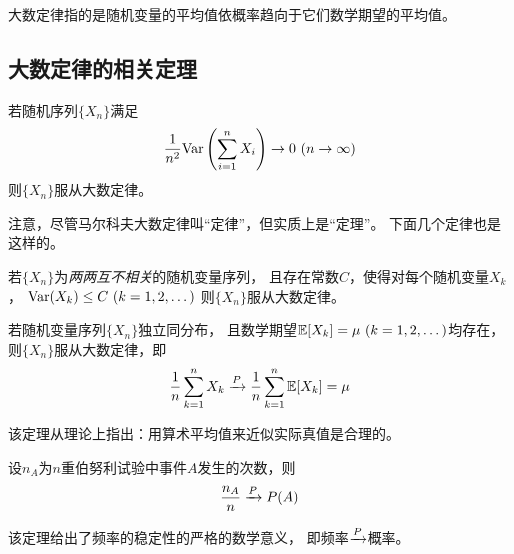 \begin{remark}
  大数定律指的是随机变量的平均值依概率趋向于它们数学期望的平均值。
\end{remark}

\subsection{大数定律的相关定理}
\begin{theorem}[马尔可夫大数定律]
  若随机序列$\{X_n\}$满足
  \begin{displaymath}
    \frac{1}{n^2}\textrm{Var}\left(\sum_{i=1}^{n}X_i\right)\to 0\ (n\to\infty)
  \end{displaymath}
  则$\{X_n\}$服从大数定律。
\end{theorem}

\begin{remark}
  注意，尽管马尔科夫大数定律叫``定律''，但实质上是``定理''。
  下面几个定律也是这样的。
\end{remark}

\begin{theorem}[切比雪夫大数定律]
  若$\{X_n\}$为\emph{两两互不相关}的随机变量序列，
  且存在常数$C$，使得对每个随机变量$X_k$，
  $\textrm{Var}(X_k)\le C\ (k=1,2,\dots)$
  则$\{X_n\}$服从大数定律。
\end{theorem}

\begin{theorem}[辛钦大数定律]
  若随机变量序列$\{X_n\}$独立同分布，
  且数学期望$\mexpect[X_k]=\mu\ (k=1,2,\dots)$均存在，
  则$\{X_n\}$服从大数定律，即
  \begin{displaymath}
    \frac{1}{n}\sum_{k=1}^n X_k \xrightarrow{P}
      \frac{1}{n}\sum_{k=1}^{n}\mathbb{E}[X_k] = \mu
  \end{displaymath}
\end{theorem}

\begin{remark}
  该定理从理论上指出：用算术平均值来近似实际真值是合理的。
\end{remark}

\begin{theorem}[伯努利大数定律]
  设$n_A$为$n$重伯努利试验中事件$A$发生的次数，则
  \begin{displaymath}
    \frac{n_A}{n}\xrightarrow{P} P(A)
  \end{displaymath}
\end{theorem}

\begin{remark}
  该定理给出了频率的稳定性的严格的数学意义，
  即频率$\xrightarrow{P}$概率。
\end{remark}

